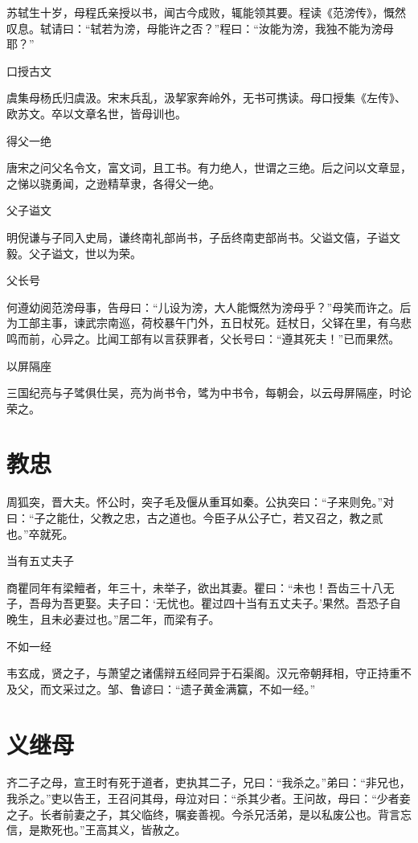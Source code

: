 \documentclass[a4paper,12pt,UTF8,twoside]{ctexbook}
\begin{document}
    苏轼生十岁，母程氏亲授以书，闻古今成败，辄能领其要。程读《范滂传》，慨然叹息。轼请曰：“轼若为滂，母能许之否？”程曰：“汝能为滂，我独不能为滂母耶？”
    
    口授古文
    
    虞集母杨氏归虞汲。宋末兵乱，汲挈家奔岭外，无书可携读。母口授集《左传》、欧苏文。卒以文章名世，皆母训也。
    
    得父一绝
    
    唐宋之问父名令文，富文词，且工书。有力绝人，世谓之三绝。后之问以文章显，之悌以骁勇闻，之逊精草隶，各得父一绝。
    
    父子谥文
    
    明倪谦与子同入史局，谦终南礼部尚书，子岳终南吏部尚书。父谥文僖，子谥文毅。父子谥文，世以为荣。
    
    父长号
    
    何遵幼阅范滂母事，告母曰：“儿设为滂，大人能慨然为滂母乎？”母笑而许之。后为工部主事，谏武宗南巡，荷校暴午门外，五日杖死。廷杖日，父铎在里，有乌悲鸣而前，心异之。比闻工部有以言获罪者，父长号曰：“遵其死夫！”已而果然。
    
    以屏隔座
    
    三国纪亮与子骘俱仕吴，亮为尚书令，骘为中书令，每朝会，以云母屏隔座，时论荣之。
    
    \section{教忠}
    
    周狐突，晋大夫。怀公时，突子毛及偃从重耳如秦。公执突曰：“子来则免。”对曰：“子之能仕，父教之忠，古之道也。今臣子从公子亡，若又召之，教之贰也。”卒就死。
    
    当有五丈夫子
    
    商瞿同年有梁鳣者，年三十，未举子，欲出其妻。瞿曰：“未也！吾齿三十八无子，吾母为吾更娶。夫子曰：‘无忧也。瞿过四十当有五丈夫子。’果然。吾恐子自晚生，且未必妻过也。”居二年，而梁有子。
    
    不如一经
    
    韦玄成，贤之子，与萧望之诸儒辩五经同异于石渠阁。汉元帝朝拜相，守正持重不及父，而文采过之。邹、鲁谚曰：“遗子黄金满籯，不如一经。”
    
    \section{义继母}
    
    齐二子之母，宣王时有死于道者，吏执其二子，兄曰：“我杀之。”弟曰：“非兄也，我杀之。”吏以告王，王召问其母，母泣对曰：“杀其少者。王问故，母曰：“少者妾之子。长者前妻之子，其父临终，嘱妾善视。今杀兄活弟，是以私废公也。背言忘信，是欺死也。”王高其义，皆赦之。
    
\end{document}
